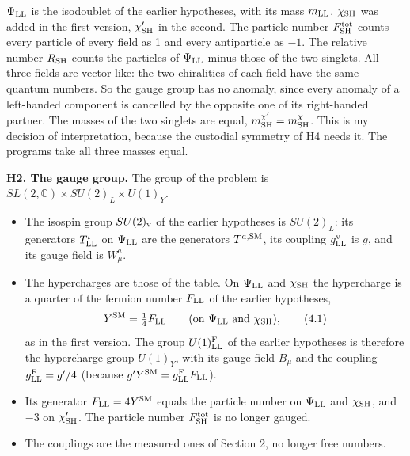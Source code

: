 \documentclass[
  10pt,
]{article}
\providecommand{\tightlist}{%
  \setlength{\itemsep}{0pt}\setlength{\parskip}{0pt}}
\begin{document}
\(\Psi_{\rm LL}\) is the isodoublet of the earlier hypotheses, with its
mass \(m_{\rm LL}\). \(\chi_{\rm SH}\) was added in the first version,
\(\chi'_{\rm SH}\) in the second. The particle number
\(F^{\rm tot}_{\rm SH}\) counts every particle of every field as 1 and
every antiparticle as \(-1\). The relative number \(R_{\rm SH}\) counts
the particles of \(\Psi_{\rm LL}\) minus those of the two singlets. All
three fields are vector-like: the two chiralities of each field have the
same quantum numbers. So the gauge group has no anomaly, since every
anomaly of a left-handed component is cancelled by the opposite one of
its right-handed partner. The masses of the two singlets are equal,
\(m^{\chi'}_{\rm SH}=m^\chi_{\rm SH}\). This is my decision of
interpretation, because the custodial symmetry of H4 needs it. The
programs take all three masses equal.

\textbf{H2. The gauge group.} The group of the problem is
\(SL(2,\mathbb C)\times SU(2)_L\times U(1)_Y\).

\begin{itemize}
\tightlist
\item
  The isospin group \(SU(2)_{\rm v}\) of the earlier hypotheses is
  \(SU(2)_L\): its generators \(T^\iota_{\rm LL}\) on \(\Psi_{\rm LL}\)
  are the generators \(T^{a,{\rm SM}}\), its coupling
  \(g^{\rm v}_{\rm LL}\) is \(g\), and its gauge field is \(W^a_\mu\).
\item
  The hypercharges are those of the table. On \(\Psi_{\rm LL}\) and
  \(\chi_{\rm SH}\) the hypercharge is a quarter of the fermion number
  \(F_{\rm LL}\) of the earlier hypotheses,
  \[Y^{\rm SM}=\tfrac14F_{\rm LL}\qquad(\text{on }\Psi_{\rm LL}\text{ and }\chi_{\rm SH}),\tag{4.1}\]
  as in the first version. The group \(U(1)^{\rm F}_{\rm LL}\) of the
  earlier hypotheses is therefore the hypercharge group \(U(1)_Y\), with
  its gauge field \(B_\mu\) and the coupling \(g^{\rm F}_{\rm LL}=g'/4\)
  (because \(g'Y^{\rm SM}=g^{\rm F}_{\rm LL}F_{\rm LL}\)).
\item
  Its generator \(F_{\rm LL}=4Y^{\rm SM}\) equals the particle number on
  \(\Psi_{\rm LL}\) and \(\chi_{\rm SH}\), and \(-3\) on
  \(\chi'_{\rm SH}\). The particle number \(F^{\rm tot}_{\rm SH}\) is no
  longer gauged.
\item
  The couplings are the measured ones of Section 2, no longer free
  numbers.
\end{itemize}
\end{document}
